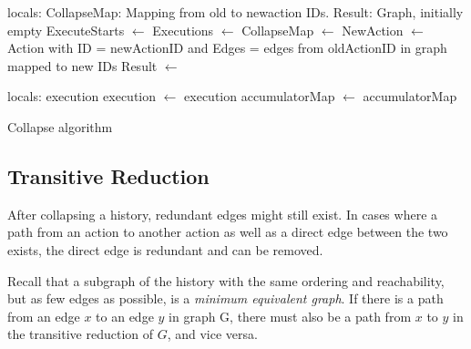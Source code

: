 	\begin{algorithm}
		\begin{algorithmic}
			\State
				locals: CollapseMap: Mapping from old to newaction IDs.
				\State\hspace{28pt} Result: Graph, initially empty
				\State
				\State ExecuteStarts $\leftarrow$  \State
				Executions $\leftarrow$ 
				\State
					CollapseMap $\leftarrow$ 
				\EndFor
					\State
					NewAction $\leftarrow$ Action with \State\hspace{28pt}ID = newActionID and \State\hspace{28pt}Edges = edges from oldActionID in graph mapped to new IDs\State
					Result $\leftarrow$  \State{}
				\EndFor
				
			\EndFunction
			\State
				\State locals: execution
				 \State
					execution $\leftarrow$ 
				\EndWhile\State
				\Return execution
			\EndFunction
			\State
				\State
					accumulatorMap $\leftarrow$ 
				\EndFor \State
				\Return accumulatorMap
			\EndFunction
		\end{algorithmic}
		\caption{Collapse algorithm}
		\label{alg:collapse}
	\end{algorithm}
	
	
	\subsection{Transitive Reduction}
	
	\newpar After collapsing a history, redundant edges might still exist. In cases where a path from an action to another action as well as a direct edge between the two exists, the direct edge is redundant and can be removed. 
	
	\newpar Recall that a subgraph of the history with the same ordering and reachability, but as few edges as possible, is a \textit{minimum equivalent graph}. If there is a path from an edge $x$ to an edge $y$ in graph G, there must also be a path from $x$ to $y$ in the transitive reduction of $G$, and vice versa. 
	
